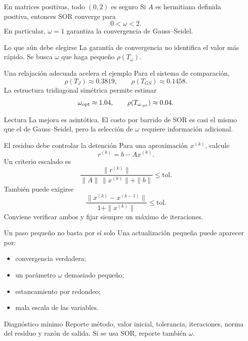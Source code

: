 \documentclass[aspectratio=169,12pt]{beamer}
\begin{document}
\begin{frame}{En matrices positivas, todo $(0,2)$ es seguro}
Si $A$ es hermitiana definida positiva, entonces SOR converge para
\[
0<\omega<2.
\]
En particular, $\omega=1$ garantiza la convergencia de Gauss--Seidel.
\begin{block}{Lo que aún debe elegirse}
La garantía de convergencia no identifica el valor más rápido. Se busca
$\omega$ que haga pequeño $\rho(T_\omega)$.
\end{block}
\end{frame}

\begin{frame}{Una relajación adecuada acelera el ejemplo}
Para el sistema de comparación,
\[
\rho(T_J)\approx0.3819,
\qquad
\rho(T_{GS})\approx0.1458.
\]
La estructura tridiagonal simétrica permite estimar
\[
\omega_{\rm opt}\approx1.04,
\qquad
\rho(T_{\omega_{\rm opt}})\approx0.04.
\]
\begin{block}{Lectura}
La mejora es asintótica. El costo por barrido de SOR es casi el mismo que el
de Gauss--Seidel, pero la selección de $\omega$ requiere información adicional.
\end{block}
\end{frame}

\begin{frame}{El residuo debe controlar la detención}
Para una aproximación $x^{(k)}$, calcule
\[
r^{(k)}=b-Ax^{(k)}.
\]
Un criterio escalado es
\[
\frac{\|r^{(k)}\|}
{\|A\|\,\|x^{(k)}\|+\|b\|}
\leq \text{tol}.
\]
También puede exigirse
\[
\frac{\|x^{(k)}-x^{(k-1)}\|}
{1+\|x^{(k)}\|}\leq\text{tol}.
\]
Conviene verificar ambos y fijar siempre un máximo de iteraciones.
\end{frame}

\begin{frame}{Un paso pequeño no basta por sí solo}
Una actualización pequeña puede aparecer por:
\begin{itemize}
  \item convergencia verdadera;
  \item un parámetro $\omega$ demasiado pequeño;
  \item estancamiento por redondeo;
  \item mala escala de las variables.
\end{itemize}
\begin{block}{Diagnóstico mínimo}
Reporte método, valor inicial, tolerancia, iteraciones, norma del residuo y
razón de salida. Si se usa SOR, reporte también $\omega$.
\end{block}
\end{frame}
\end{document}
